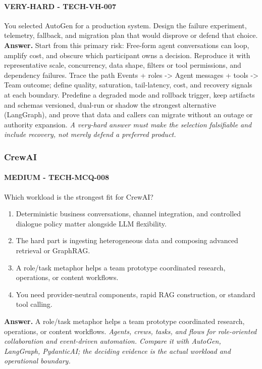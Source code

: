 \paragraph{VERY-HARD - TECH-VH-007} You selected AutoGen for a production system. Design the failure experiment, telemetry, fallback, and migration plan that would disprove or defend that choice.
\textbf{Answer.} Start from this primary risk: Free-form agent conversations can loop, amplify cost, and obscure which participant owns a decision. Reproduce it with representative scale, concurrency, data shape, filters or tool permissions, and dependency failures. Trace the path Events + roles -> Agent messages + tools -> Team outcome; define quality, saturation, tail-latency, cost, and recovery signals at each boundary. Predefine a degraded mode and rollback trigger, keep artifacts and schemas versioned, dual-run or shadow the strongest alternative (LangGraph), and prove that data and callers can migrate without an outage or authority expansion.
\textit{A very-hard answer must make the selection falsifiable and include recovery, not merely defend a preferred product.}
\subsubsection*{CrewAI}
\paragraph{MEDIUM - TECH-MCQ-008} Which workload is the strongest fit for CrewAI?
\begin{enumerate}[label=\Alph*.]
\item Deterministic business conversations, channel integration, and controlled dialogue policy matter alongside LLM flexibility.
\item The hard part is ingesting heterogeneous data and composing advanced retrieval or GraphRAG.
\item A role/task metaphor helps a team prototype coordinated research, operations, or content workflows.
\item You need provider-neutral components, rapid RAG construction, or standard tool calling.
\end{enumerate}
\textbf{Answer.} A role/task metaphor helps a team prototype coordinated research, operations, or content workflows.
\textit{Agents, crews, tasks, and flows for role-oriented collaboration and event-driven automation. Compare it with AutoGen, LangGraph, PydanticAI; the deciding evidence is the actual workload and operational boundary.}
